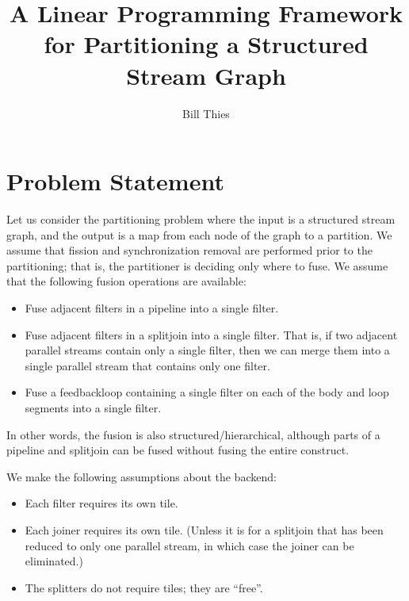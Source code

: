 \documentclass[12pt]{article}
\title{A Linear Programming Framework \\ for Partitioning a Structured Stream Graph}
\author{Bill Thies}
\begin{document}
  \maketitle

  \newcommand{\mt}[1]{\mbox{\it #1}}
  \newcommand{\todo}[1]{\framebox{\bf #1}}
  \newcommand{\head}[1]{\subsubsection*{#1}}

  \section{Problem Statement}

  Let us consider the partitioning problem where the input is a
  structured stream graph, and the output is a map from each node of
  the graph to a partition.  We assume that fission and
  synchronization removal are performed prior to the partitioning;
  that is, the partitioner is deciding only where to fuse.  We assume
  that the following fusion operations are available:
  \begin{itemize}

    \item Fuse adjacent filters in a pipeline into a single filter.

    \item Fuse adjacent filters in a splitjoin into a single filter.
    That is, if two adjacent parallel streams contain only a single
    filter, then we can merge them into a single parallel stream that
    contains only one filter.

    \item Fuse a feedbackloop containing a single filter on each of
    the body and loop segments into a single filter.

  \end{itemize}
  In other words, the fusion is also structured/hierarchical, although
  parts of a pipeline and splitjoin can be fused without fusing the
  entire construct.

  We make the following assumptions about the backend:
  \begin{itemize}

    \item Each filter requires its own tile.

    \item Each joiner requires its own tile.  (Unless it is for a
    splitjoin that has been reduced to only one parallel stream, in
    which case the joiner can be eliminated.)

    \item The splitters do not require tiles; they are ``free''.

  \end{itemize}
\end{document}
